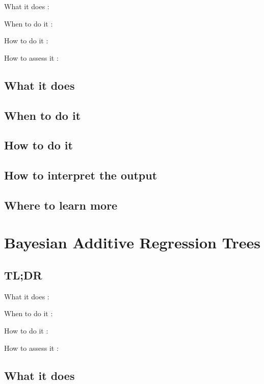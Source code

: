 \documentclass[
]{book}
\begin{document}
What it does
:

When to do it
:

How to do it
:

How to assess it
:

\hypertarget{what-it-does-18}{%
\section{What it does}\label{what-it-does-18}}

\hypertarget{when-to-do-it-18}{%
\section{When to do it}\label{when-to-do-it-18}}

\hypertarget{how-to-do-it-18}{%
\section{How to do it}\label{how-to-do-it-18}}

\hypertarget{how-to-interpret-the-output-18}{%
\section{How to interpret the output}\label{how-to-interpret-the-output-18}}

\hypertarget{where-to-learn-more-18}{%
\section{Where to learn more}\label{where-to-learn-more-18}}

\hypertarget{bayesian-additive-regression-trees}{%
\chapter{Bayesian Additive Regression Trees}\label{bayesian-additive-regression-trees}}

\hypertarget{tldr-19}{%
\section{TL;DR}\label{tldr-19}}

What it does
:

When to do it
:

How to do it
:

How to assess it
:

\hypertarget{what-it-does-19}{%
\section{What it does}\label{what-it-does-19}}
\end{document}
